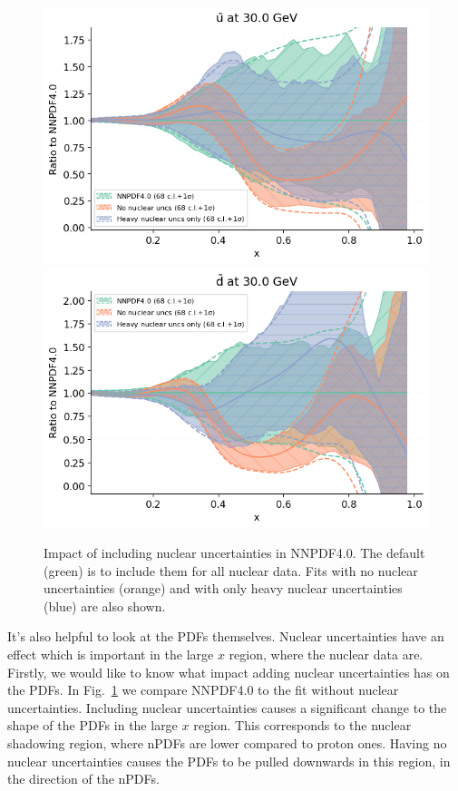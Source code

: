 \begin{figure}[H]
  \begin{center}
      \includegraphics[width=0.49\linewidth]{nuclear/plots/ubar1.png}
     \includegraphics[width=0.49\linewidth]{nuclear/plots/dbar1.png}
    \caption{Impact of including nuclear uncertainties in NNPDF4.0. The default (green) is to include them for all nuclear data. Fits with no nuclear uncertainties (orange) and with only heavy nuclear uncertainties (blue) are also shown.
    \label{fig:pdfs1} }
    \end{center}
\end{figure}   

It's also helpful to look at the PDFs themselves. Nuclear uncertainties have an effect which is important in the large $x$ region, where the nuclear data are. Firstly, we would like to know what impact adding nuclear uncertainties has on the PDFs. In Fig.~\ref{fig:pdfs1} we compare NNPDF4.0 to the fit without nuclear uncertainties. Including nuclear uncertainties causes a significant change to the shape of the PDFs in the large $x$ region. This corresponds to the nuclear shadowing region, where nPDFs are lower compared to proton ones. Having no nuclear uncertainties causes the PDFs to be pulled downwards in this region, in the direction of the nPDFs.

